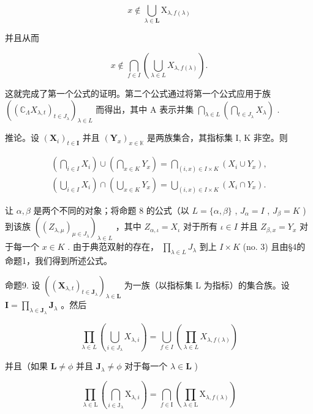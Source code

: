 \[
x \notin \bigcup_ {\lambda \in \mathbf {L}} \mathrm{X} _ {\lambda , f (\lambda)}
\]

并且从而

\[
x \notin \bigcap_ {f \in I} \left(\bigcup_ {\lambda \in L} X _ {\lambda , f (\lambda)}\right).
\]

这就完成了第一个公式的证明。第二个公式通过将第一个公式应用于族 \(\left((\mathbb{C}_{\Lambda}X_{\lambda,t})_{t\in J_{\lambda}}\right)_{\lambda \in L}\) 而得出，其中 A 表示并集 \(\bigcap_{\lambda \in L}\left(\bigcap_{t\in J_{\lambda}}X_{\lambda}\right)\) .

推论。设 \((\mathbf{X}_i)_{t\in \mathbf{I}}\) 并且 \((\mathbf{Y}_x)_{x\in \mathbb{K}}\) 是两族集合，其指标集 I, K 非空。则

\[
\begin{array}{l} \left(\bigcap_ {i \in I} X _ {i}\right) \cup \left(\bigcap_ {x \in K} Y _ {x}\right) = \bigcap_ {(i, x) \in I \times K} (X _ {i} \cup Y _ {x}), \\ \left(\bigcup_ {i \in I} X _ {i}\right) \cap \left(\bigcup_ {x \in K} Y _ {x}\right) = \bigcup_ {(i, x) \in I \times K} (X _ {i} \cap Y _ {x}). \end{array}
\]

让 \(\alpha, \beta\) 是两个不同的对象；将命题 8 的公式（以 \(L = \{\alpha, \beta\}\) , \(J_{\alpha} = I\) , \(J_{\beta} = K\) ) 到该族 \(((Z_{\lambda, \mu})_{\mu \in J_{\lambda}})_{\lambda \in L}\) ，其中 \(Z_{\alpha, \iota} = X_{\iota}\) 对于所有 \(\iota \in I\) 并且 \(Z_{\beta, x} = Y_{x}\) 对于每一个 \(x \in K\) . 由于典范双射的存在， \(\prod_{\lambda \in L} J_{\lambda}\) 到上 \(I \times K\) (no. 3) 且由§4的命题1，我们得到所述公式。

命题9. 设 \(((\mathbf{X}_{\lambda, t})_{t \in \mathbf{J}_{\lambda}})_{\lambda \in \mathbf{L}}\) 为一族（以指标集 L 为指标）的集合族。设 \(\mathbf{I} = \prod_{\lambda \in \mathbf{J}_{\lambda}} \mathbf{J}_{\lambda}\) 。然后

\[
\prod_ {\lambda \in L} \left(\bigcup_ {i \in J _ {\lambda}} X _ {\lambda , i}\right) = \bigcup_ {f \in I} \left(\prod_ {\lambda \in L} X _ {\lambda , f (\lambda)}\right)
\]

并且（如果 \(\mathbf{L} \neq \phi\) 并且 \(\mathbf{J}_{\lambda} \neq \phi\) 对于每一个 \(\lambda \in \mathbf{L}\) )

\[
\prod_ {\lambda \in \mathrm{L}} \left(\bigcap_ {i \in \mathrm{J} _ {\lambda}} \mathrm{X} _ {\lambda , i}\right) = \bigcap_ {f \in \mathrm{I}} \left(\prod_ {\lambda \in \mathrm{L}} \mathrm{X} _ {\lambda , f (\lambda)}\right)
\]

